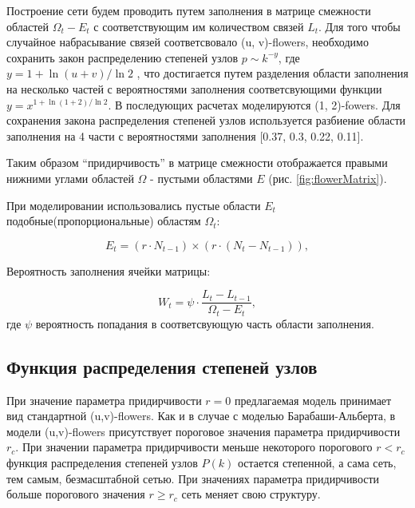 \documentclass[10pt,aps,pra]{revtex4-1}
\begin{document}
        Построение сети будем проводить путем заполнения в матрице смежности областей $\Omega_t - E_t$ с соответствующим им количеством связей $L_t$. Для того чтобы случайное набрасывание связей соответсвовало (u, v)-flowers, необходимо сохранить закон распределению степеней узлов $p \sim k^{-y}$, где $y=1+\ln(u+v)/\ln{2}$ \cite{Rozenfeld2}, что достигается путем разделения области заполнения на несколько частей с вероятностями заполнения соответсвующими функции $y=x^{1+\ln(1+2)/\ln{2}}$. В последующих расчетах моделируются (1, 2)-fowers. Для сохранения закона распределения степеней узлов используется разбиение области заполнения на 4 части с вероятностями заполнения [0.37, 0.3, 0.22, 0.11].

        Таким образом ``придирчивость'' в матрице смежности отображается правыми нижними углами областей $\Omega$ - пустыми областями $E$ (рис. \ref{fig:flowerMatrix}). 
        
        При моделировании использовались пустые области $E_t$ подобные(пропорциональные) областям $\Omega_t$:

            \begin{equation}
                E_t= (r \cdot N_{t-1}) \times (r \cdot (N_t - N_{t-1})),
            \end{equation}

        Вероятность заполнения ячейки матрицы:
        
            \begin{equation}
                W_t=\psi \cdot \frac{L_t-L_{t-1}}{\Omega_t-E_t},
            \end{equation}
                где $\psi$ вероятность попадания в соответсвующую часть области заполнения.

    \subsection{Функция распределения степеней узлов}

        При значение параметра придирчивости $r=0$ предлагаемая модель принимает вид стандартной (u,v)-flowers. Как и в случае с моделью Барабаши-Альберта, в модели (u,v)-flowers присутствует пороговое значения параметра придирчивости $r_c$. При значении параметра придирчивости меньше некоторого порогового $r<r_c$ функция распределения степеней узлов $P(k)$ остается степенной, а сама сеть, тем самым, безмасштабной сетью. При значениях параметра придирчивости больше порогового значения $r \geq r_c$ сеть меняет свою структуру. 
\end{document}
